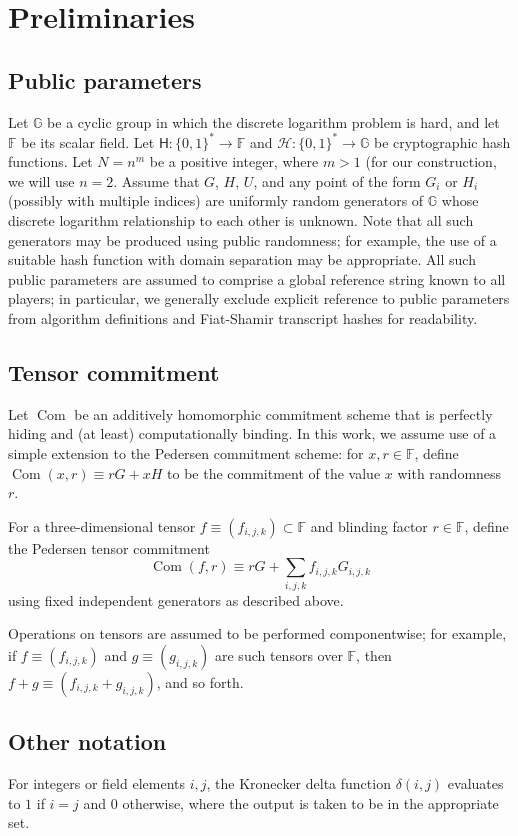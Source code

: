 \documentclass{article}
\newcommand{\G}{\mathbb{G}}
\newcommand{\F}{\mathbb{F}}
\newcommand{\hs}{\mathsf{H}}
\newcommand{\hp}{\mathcal{H}}
\newcommand{\com}{\operatorname{Com}}
\theoremstyle{definition}
\begin{document}
\section{Preliminaries}
\subsection{Public parameters}
Let $\G$ be a cyclic group in which the discrete logarithm problem is hard, and let $\F$ be its scalar field.
Let $\hs: \{0,1\}^* \to \F$ and $\hp: \{0,1\}^* \to \G$ be cryptographic hash functions.
Let $N = n^m$ be a positive integer, where $m > 1$ (for our construction, we will use $n = 2$.
Assume that $G$, $H$, $U$, and any point of the form $G_i$ or $H_i$ (possibly with multiple indices) are uniformly random generators of $\G$ whose discrete logarithm relationship to each other is unknown.
Note that all such generators may be produced using public randomness; for example, the use of a suitable hash function with domain separation may be appropriate.
All such public parameters are assumed to comprise a global reference string known to all players; in particular, we generally exclude explicit reference to public parameters from algorithm definitions and Fiat-Shamir transcript hashes for readability.


\subsection{Tensor commitment}
Let $\com$ be an additively homomorphic commitment scheme that is perfectly hiding and (at least) computationally binding.
In this work, we assume use of a simple extension to the Pedersen commitment scheme: for $x,r \in \F$, define $\com(x,r) \equiv rG + xH$ to be the commitment of the value $x$ with randomness $r$.

For a three-dimensional tensor $f \equiv (f_{i,j,k}) \subset \F$ and blinding factor $r \in \F$, define the Pedersen tensor commitment
$$\com(f,r) \equiv rG + \sum_{i,j,k} f_{i,j,k} G_{i,j,k}$$
using fixed independent generators as described above.

Operations on tensors are assumed to be performed componentwise; for example, if $f \equiv (f_{i,j,k})$ and $g \equiv (g_{i,j,k})$ are such tensors over $\F$, then $f + g \equiv (f_{i,j,k} + g_{i,j,k})$, and so forth.


\subsection{Other notation}
For integers or field elements $i,j$, the Kronecker delta function $\delta(i,j)$ evaluates to $1$ if $i=j$ and $0$ otherwise, where the output is taken to be in the appropriate set.
\end{document}
